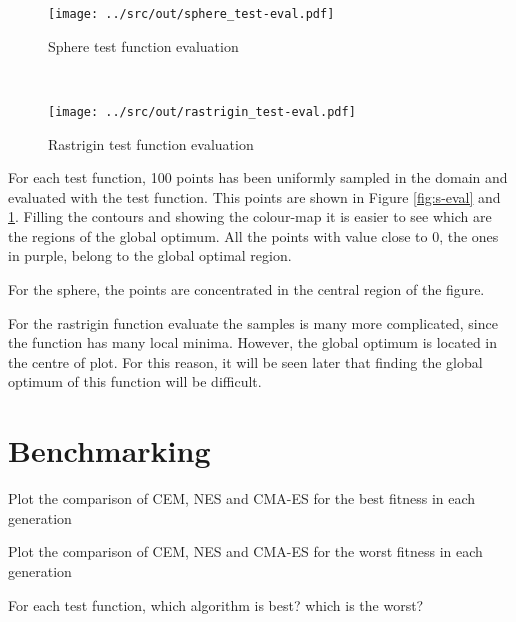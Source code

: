 \documentclass[a4paper,12pt]{article} %
\begin{document}
\begin{figure}[htb]
	\begin{minipage}[b]{.49\textwidth}
		\centering
		\texttt{[image: ../src/out/sphere\_test-eval.pdf]}	
		\caption{Sphere test function evaluation}
		\label{fig:s-eval}
	\end{minipage}
	~
	\begin{minipage}[b]{.49\textwidth}
		\centering
		\texttt{[image: ../src/out/rastrigin\_test-eval.pdf]}	
		\caption{Rastrigin test function evaluation}
		\label{fig:r-eval}
	\end{minipage}
\end{figure}

For each test function, 100 points has been uniformly sampled in the domain and evaluated with the test function. This points are shown in Figure \ref{fig:s-eval} and \ref{fig:r-eval}. 
Filling the contours and showing the colour-map it is easier to see which are the regions of the global optimum. All the points with value close to 0, the ones in purple, belong to the global optimal region.


For the sphere, the points are concentrated in the central region of the figure. 

For the rastrigin function evaluate the samples is many more complicated, since the function has many local minima. However, the global optimum is located in the centre of plot. For this reason, it will be seen later that finding the global optimum of this function will be difficult.
 



			
\section{Benchmarking}
Plot the comparison of CEM, NES and CMA-ES for the best fitness in each generation

Plot the comparison of CEM, NES and CMA-ES for the worst fitness in each generation

For each test function, which algorithm is best? which is the worst?
\end{document}
